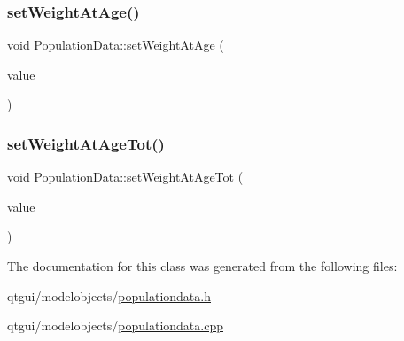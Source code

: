 \mbox{\label{class_population_data_ac4ff0185284bbbb41b1c0efb15ade2cc}} 
\subsubsection{\texorpdfstring{setWeightAtAge()}{setWeightAtAge()}}
{\footnotesize\ttfamily void Population\+Data\+::set\+Weight\+At\+Age (\begin{DoxyParamCaption}\item[{const Q\+Vector$<$ double $>$ \&}]{value }\end{DoxyParamCaption})}

\mbox{\label{class_population_data_a064edc9dd6b92f83d592b0ab46ad4e5f}} 
\subsubsection{\texorpdfstring{setWeightAtAgeTot()}{setWeightAtAgeTot()}}
{\footnotesize\ttfamily void Population\+Data\+::set\+Weight\+At\+Age\+Tot (\begin{DoxyParamCaption}\item[{double}]{value }\end{DoxyParamCaption})}



The documentation for this class was generated from the following files\+:\begin{DoxyCompactItemize}
\item 
qtgui/modelobjects/\mbox{\hyperlink{populationdata_8h}{populationdata.\+h}}\item 
qtgui/modelobjects/\mbox{\hyperlink{populationdata_8cpp}{populationdata.\+cpp}}\end{DoxyCompactItemize}
